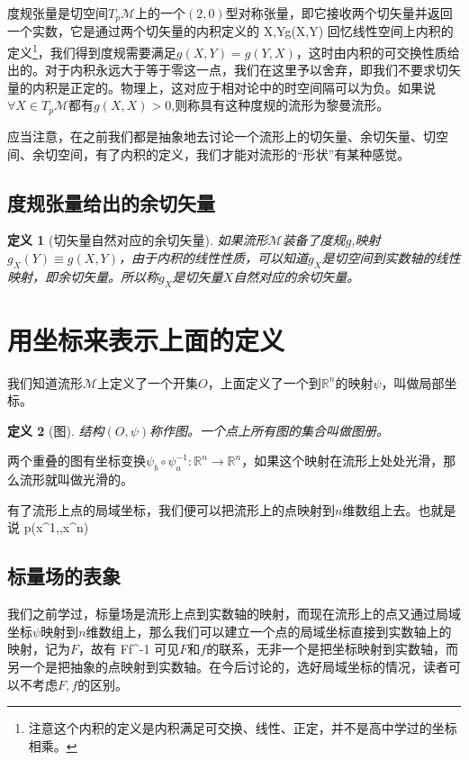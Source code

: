 \documentclass[11pt,a4paper]{ctexbook}
\newtheorem{definition}{\hspace{2em} 定义}[section]
\begin{document}
度规张量是切空间$T_p\mathcal{M}$上的一个$(2,0)$型对称张量，即它接收两个切矢量并返回一个实数，它是通过两个切矢量的内积定义的
\be
\langle X,Y\rangle \equiv g(X,Y)
\ee
回忆线性空间上内积的定义\footnote{注意这个内积的定义是内积满足可交换、线性、正定，并不是高中学过的坐标相乘。}，我们得到度规需要满足$g(X,Y) = g(Y,X)$，这时由内积的可交换性质给出的。对于内积永远大于等于零这一点，我们在这里予以舍弃，即我们不要求切矢量的内积是正定的。物理上，这对应于相对论中的时空间隔可以为负。如果说$\forall X \in T_p\mathcal{M}$都有$g(X,X)>0$,则称具有这种度规的流形为{\color{red}黎曼流形}。

应当注意，在之前我们都是抽象地去讨论一个流形上的切矢量、余切矢量、切空间、余切空间，有了内积的定义，我们才能对流形的“形状”有某种感觉。
\subsection{度规张量给出的余切矢量}
\begin{definition}[切矢量自然对应的余切矢量]
  如果流形$\mathcal{M}$装备了度规$g$,映射$g_X(Y)\equiv g(X,Y)$，由于内积的线性性质，可以知道$g_X$是切空间到实数轴的线性映射，即余切矢量。所以称$g_X$是切矢量$X$自然对应的余切矢量。
\end{definition}
\section{用坐标来表示上面的定义}
我们知道流形$\mathcal{M}$上定义了一个开集$O$，上面定义了一个到$\mathbb{R}^n$的映射$\psi$，叫做局部坐标。
\begin{definition}[图]
  结构$(O,\psi)$称作图。一个点上所有图的集合叫做图册。
\end{definition}
两个重叠的图有坐标变换$\psi_b\circ \psi_a^{-1}: \mathbb{R}^n\rightarrow \mathbb{R}^n$，如果这个映射在流形上处处光滑，那么流形就叫做光滑的。

有了流形上点的局域坐标，我们便可以把流形上的点映射到$n$维数组上去。也就是说
\beq
p\rightarrow \left(x^1,\cdots ,x^n\right)
\eeq
\subsection{标量场的表象}
我们之前学过，标量场是流形上点到实数轴的映射，而现在流形上的点又通过局域坐标$\psi$映射到$n$维数组上，那么我们可以建立一个点的局域坐标直接到实数轴上的映射，记为$F$，故有
\beq
F\equiv f\circ \psi^{-1}
\eeq
可见$F$和$f$的联系，无非一个是把坐标映射到实数轴，而另一个是把抽象的点映射到实数轴。在今后讨论的，选好局域坐标的情况，读者可以不考虑$F,f$的区别。
\end{document}
